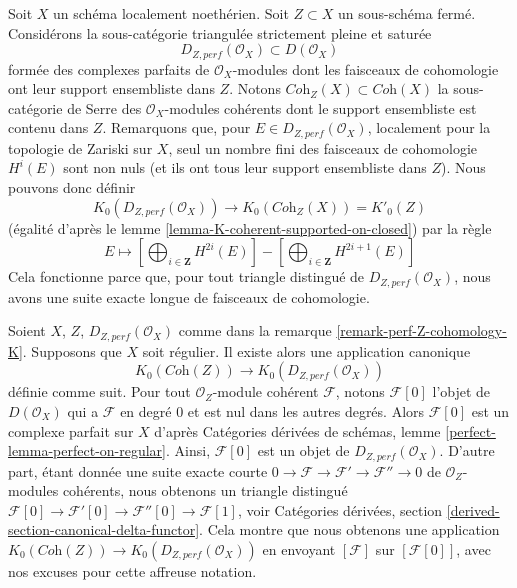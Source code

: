 \begin{remark}
\label{remark-perf-Z-cohomology-K}
Soit $X$ un schéma localement noethérien.
Soit $Z \subset X$ un sous-schéma fermé. Considérons la sous-catégorie triangulée
strictement pleine et saturée
$$
D_{Z, perf}(\mathcal{O}_X) \subset D(\mathcal{O}_X)
$$
formée des complexes parfaits de $\mathcal{O}_X$-modules
dont les faisceaux de cohomologie ont leur support ensembliste dans $Z$.
Notons $\textit{Coh}_Z(X) \subset \textit{Coh}(X)$
la sous-catégorie de Serre des $\mathcal{O}_X$-modules cohérents dont le support
ensembliste est contenu dans $Z$. Remarquons que, pour
$E \in D_{Z, perf}(\mathcal{O}_X)$, localement pour la topologie de Zariski sur $X$,
seul un nombre fini des faisceaux de cohomologie $H^i(E)$ sont non nuls
(et ils ont tous leur support ensembliste dans $Z$).
Nous pouvons donc définir
$$
K_0(D_{Z, perf}(\mathcal{O}_X))
\longrightarrow
K_0(\textit{Coh}_Z(X)) = K'_0(Z)
$$
(égalité d'après le lemme \ref{lemma-K-coherent-supported-on-closed}) par la règle
$$
E \longmapsto
[\bigoplus\nolimits_{i \in \mathbf{Z}} H^{2i}(E)] -
[\bigoplus\nolimits_{i \in \mathbf{Z}} H^{2i + 1}(E)]
$$
Cela fonctionne parce que, pour tout triangle distingué de
$D_{Z, perf}(\mathcal{O}_X)$, nous avons une suite exacte longue de
faisceaux de cohomologie.
\end{remark}

\begin{remark}
\label{remark-perf-Z-regular}
Soient $X$, $Z$, $D_{Z, perf}(\mathcal{O}_X)$ comme dans la
remarque \ref{remark-perf-Z-cohomology-K}. Supposons que $X$ soit régulier.
Il existe alors une application canonique
$$
K_0(\textit{Coh}(Z)) \longrightarrow K_0(D_{Z, perf}(\mathcal{O}_X))
$$
définie comme suit. Pour tout $\mathcal{O}_Z$-module cohérent
$\mathcal{F}$, notons $\mathcal{F}[0]$ l'objet de $D(\mathcal{O}_X)$
qui a $\mathcal{F}$ en degré $0$ et est nul dans les autres degrés.
Alors $\mathcal{F}[0]$ est un complexe parfait sur $X$ d'après
Catégories dérivées de schémas, lemme \ref{perfect-lemma-perfect-on-regular}.
Ainsi, $\mathcal{F}[0]$ est un objet de $D_{Z, perf}(\mathcal{O}_X)$.
D'autre part, étant donnée une suite exacte courte
$0 \to \mathcal{F} \to \mathcal{F}' \to \mathcal{F}'' \to 0$ de
$\mathcal{O}_Z$-modules cohérents, nous obtenons un triangle distingué
$\mathcal{F}[0] \to \mathcal{F}'[0] \to \mathcal{F}''[0] \to \mathcal{F}[1]$,
voir Catégories dérivées, section \ref{derived-section-canonical-delta-functor}.
Cela montre que nous obtenons une application
$K_0(\textit{Coh}(Z)) \to K_0(D_{Z, perf}(\mathcal{O}_X))$
en envoyant $[\mathcal{F}]$ sur $[\mathcal{F}[0]]$,
avec nos excuses pour cette affreuse notation.
\end{remark}


